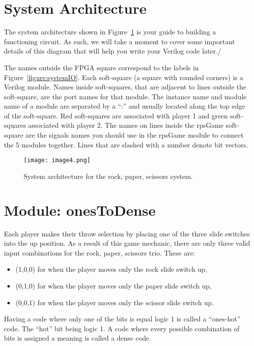 \section{System Architecture}
The system architecture shown in Figure~\ref{fig:sysArch} is your guide to building
a functioning circuit. As such, we will take a moment to cover some important
details of this diagram that will help you write your Verilog code later./

The names outside
the FPGA square correspond to the labels in Figure~\ref{figure:systemIO}. Each soft-square
(a square with rounded corners) is a Verilog module. Names inside
soft-squares, that are adjacent to lines outside the soft-square, are
the port names for that module. The instance name and module name of a
module are separated by a ``:'' and usually located along the top edge
of the soft-square. Red soft-squares are associated with player 1 and
green soft-squares associated with player 2. The names on lines inside
the rpsGame soft-square are the signals names you should use in the
rpsGame module to connect the 5 modules together. Lines that are slashed
with a number denote bit vectors.

\begin{figure}[ht]
\texttt{[image:  image4.png]}
\caption{System architecture for the rock, paper, scissors system.}
\label{fig:sysArch}
\end{figure}

\hypertarget{onestodense-module}{%
\section{Module: onesToDense}
\label{onestodense-module}}

Each player makes their throw selection by placing one of the three
slide switches into the up position. As a result of this game mechanic,
there are only three valid input combinations for the rock, paper,
scissors trio. These are:

\begin{itemize}
\item
  (1,0,0) for when the player moves only the rock slide switch up,
\item
  (0,1,0) for when the player moves only the paper slide switch up,
\item
  (0,0,1) for when the player moves only the scissor slide switch up.
\end{itemize}

Having a code where only one of the bits is equal logic 1 is called a
``ones-hot'' code. The ``hot'' bit being logic 1. A code where every
possible combination of bits is assigned a meaning is called a dense
code.


